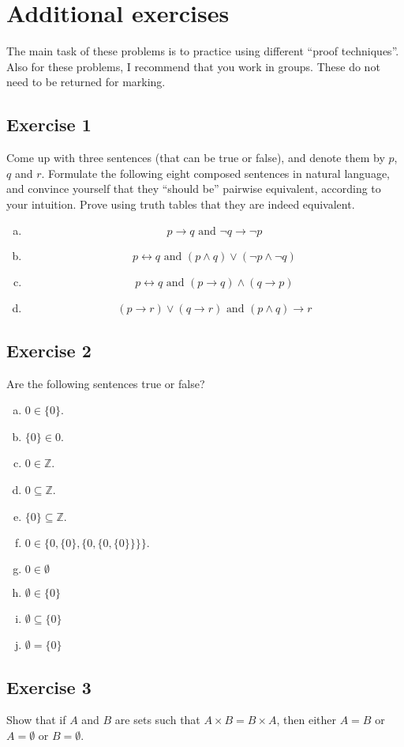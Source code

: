 \documentclass{amsart}
\newcommand{\Z}{\mathbb{Z}}
\theoremstyle{definition} \newtheorem*{definition}{Definition}
\theoremstyle{remark} \newtheorem*{ex}{Example}
\begin{document}
\section*{Additional exercises}
The main task of these problems is to practice using different ``proof techniques''. Also for these problems, I recommend that you work in groups. These do not need to be returned for marking.

\subsection*{Exercise 1} 
Come up with three sentences (that can be true or false), and denote them by $p$, $q$ and $r$. Formulate the following eight composed sentences in natural language, and convince yourself  that they ``should be'' pairwise equivalent, according to your intuition.
Prove using truth tables that they are indeed equivalent. 
\begin{enumerate}[a)]
\item $$p\to q \mbox{ and }\neg q\to\neg p$$
\item $$p\leftrightarrow q \mbox{ and }(p\wedge q)\vee(\neg p\wedge\neg q)$$
\item $$p\leftrightarrow q \mbox{ and }(p\to q)\wedge(q\to p)$$
\item $$(p\to r)\vee(q\to r)\mbox{ and } (p\wedge q)\to r$$
\end{enumerate}

\subsection*{Exercise 2}
Are the following sentences true or false?
\begin{enumerate}[a)]
\item $0\in\{0\}$.
\item $\{0\}\in 0$.
\item $0\in\Z$.
\item $0\subseteq \Z$.
\item $\{0\}\subseteq \Z$.
\item $0\in\{0,\{0\}, \{0,\{0,\{0\}\}\}\}.$
\item $0\in\emptyset$
\item $\emptyset\in\{0\}$
\item $\emptyset\subseteq\{0\}$
\item $\emptyset=\{0\}$
\end{enumerate}

\subsection*{Exercise 3}
Show that if $A$ and $B$ are sets such that $A\times B = B\times A$, then either $A=B$ or $A=\emptyset$ or $B=\emptyset$.
\end{document}
